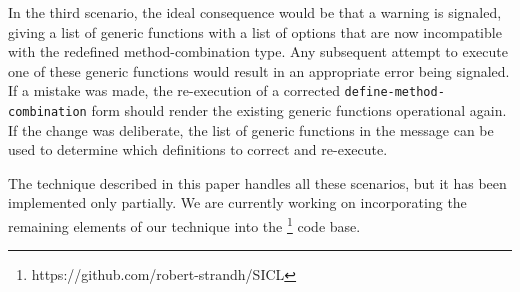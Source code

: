 In the third scenario, the ideal consequence would be that a warning
is signaled, giving a list of generic functions with a list of options
that are now incompatible with the redefined method-combination type.
Any subsequent attempt to execute one of these generic functions would
result in an appropriate error being signaled.  If a mistake was made,
the re-execution of a corrected \texttt{define-method-combination}
form should render the existing generic functions operational again.
If the change was deliberate, the list of generic functions in the
message can be used to determine which definitions to correct and
re-execute.

The technique described in this paper handles all these scenarios, but
it has been implemented only partially.  We are currently working on
incorporating the remaining elements of our technique into the
\sicl{}%
\footnote{https://github.com/robert-strandh/SICL}
code base.
